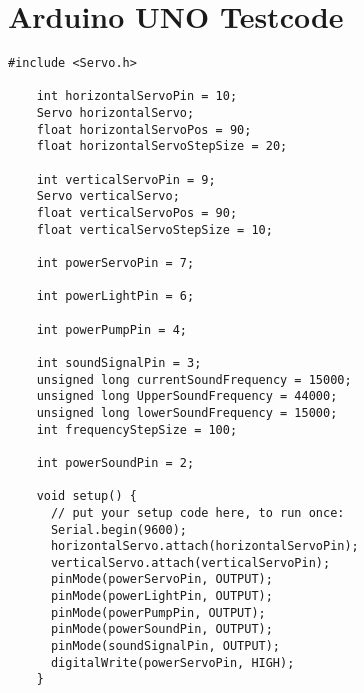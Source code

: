 
\appendix

{\let\clearpage\relax  \chapter{Arduino UNO Testcode}} \label{an:ard}

\begin{lstlisting}[label=list:Arduino_Test,caption=Arduino Test Code um alle Funktionen zu überprüfen.]
    #include <Servo.h>
    
    int horizontalServoPin = 10;
    Servo horizontalServo;
    float horizontalServoPos = 90;
    float horizontalServoStepSize = 20;
    
    int verticalServoPin = 9;
    Servo verticalServo;
    float verticalServoPos = 90;
    float verticalServoStepSize = 10;
    
    int powerServoPin = 7;
    
    int powerLightPin = 6;
    
    int powerPumpPin = 4;
    
    int soundSignalPin = 3;
    unsigned long currentSoundFrequency = 15000;
    unsigned long UpperSoundFrequency = 44000;
    unsigned long lowerSoundFrequency = 15000;
    int frequencyStepSize = 100;
    
    int powerSoundPin = 2;
    
    void setup() {
      // put your setup code here, to run once:
      Serial.begin(9600);
      horizontalServo.attach(horizontalServoPin);
      verticalServo.attach(verticalServoPin);
      pinMode(powerServoPin, OUTPUT);
      pinMode(powerLightPin, OUTPUT);
      pinMode(powerPumpPin, OUTPUT);
      pinMode(powerSoundPin, OUTPUT);
      pinMode(soundSignalPin, OUTPUT);
      digitalWrite(powerServoPin, HIGH);
    }
    

\end{lstlisting}

